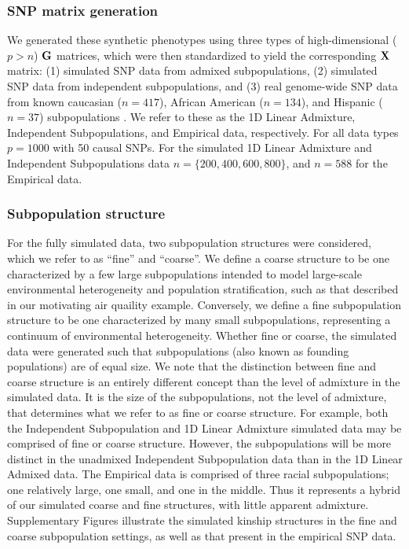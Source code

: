 \subsubsection{SNP matrix generation}

We generated these synthetic phenotypes using three types of high-dimensional ($p > n$) $\textbf{G}$ matrices, which were then standardized to yield the corresponding $\textbf{X}$ matrix: (1) simulated SNP data from admixed subpopulations, (2) simulated SNP data from independent subpopulations, and (3) real genome-wide SNP data from known caucasian ($n = 417$), African American ($n = 134$), and Hispanic ($n = 37$) subpopulations \citep{larkin2015objectives}. We refer to these as the 1D Linear Admixture, Independent Subpopulations, and Empirical data, respectively. For all data types $p = 1000$ with 50 causal SNPs. For the simulated 1D Linear Admixture and Independent Subpopulations data $n = \{200, 400, 600, 800 \}$, and $n = 588$ for the Empirical data. 


\subsubsection{Subpopulation structure}
For the fully simulated data, two subpopulation structures were considered, which we refer to as ``fine'' and ``coarse''.  We define a coarse structure to be one characterized by a few large subpopulations intended to model large-scale environmental heterogeneity and population stratification, such as that described in our motivating air quaility example. Conversely, we define a fine subpopulation structure to be one characterized by many small subpopulations, representing a continuum of environmental heterogeneity. Whether fine or coarse, the simulated data were generated such that subpopulations (also known as founding populations) are of equal size. We note that the distinction between fine and coarse structure is an entirely different concept than the level of admixture in the simulated data. It is the size of the subpopulations, not the level of admixture, that determines what we refer to as fine or coarse structure. For example, both the Independent Subpopulation and 1D Linear Admixture simulated data may be comprised of fine or coarse structure. However, the subpopulations will be more distinct in the unadmixed Independent Subpopulation data than in the 1D Linear Admixed data. The Empirical data is comprised of three racial subpopulations; one relatively large, one small, and one in the middle. Thus it represents a hybrid of our simulated coarse and fine structures, with little apparent admixture. Supplementary Figures  illustrate the simulated kinship structures in the fine and coarse subpopulation settings, as well as that present in the empirical SNP data. 

